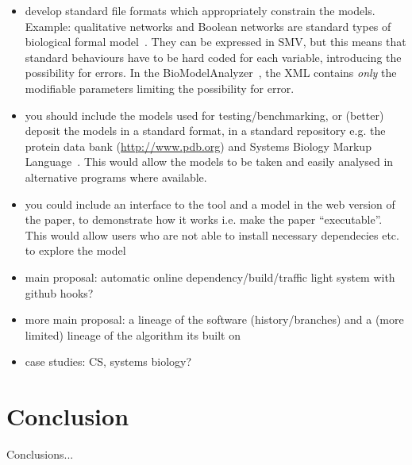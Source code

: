 \documentclass[conference]{IEEEtran}
\begin{document}
\begin{itemize}
\begin{itemize}
\end{itemize}
\item develop standard file formats which appropriately constrain the models. Example: qualitative networks and Boolean networks are standard types of biological formal model~\cite{Kauffman1969,Schaub2007}. They can be expressed in SMV, but this means that standard behaviours have to be hard coded for each variable, introducing the possibility for errors. In the BioModelAnalyzer~\cite{Benque2012}, the XML contains \emph{only} the modifiable parameters limiting the possibility for error.
\item you should include the models used for testing/benchmarking, or (better) deposit the models in a standard format, in a standard repository e.g. the protein data bank (\url{http://www.pdb.org}) and Systems Biology Markup Language~\cite{Hucka2003,Chaouiya2013}. This would allow the models to be taken and easily analysed in alternative programs where available.
\item you could include an interface to the tool and a model in the web version of the paper, to demonstrate how it works i.e. make the paper ``executable''. This would allow users who are not able to install necessary dependecies etc. to explore the model \cite{Hall2014} 
\item main proposal: automatic online dependency/build/traffic light system with github hooks?
\item more main proposal: a lineage of the software (history/branches) and a (more limited) lineage of the algorithm its built on
\item case studies: CS, systems biology?
\end{itemize}

\section{Conclusion}
Conclusions...



\end{document}
